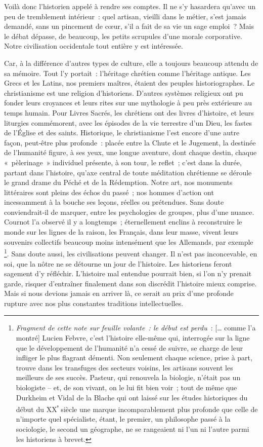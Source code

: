\documentclass[french,twoside]{book} %
\begin{document}
Voilà donc l’historien appelé à rendre ses comptes. Il ne s’y hasardera qu’avec un peu de tremblement intérieur : quel artisan, vieilli dans le métier, s’est jamais demandé, sans un pincement de cœur, s’il a fait de sa vie un sage emploi ? Mais le débat dépasse, de beaucoup, les petits scrupules d’une morale corporative. Notre civilisation occidentale tout entière y est intéressée.\par
Car, à la différence d’autres types de culture, elle a toujours beaucoup attendu de sa mémoire. Tout l’y portait : l’héritage chrétien comme l’héri­tage antique. Les Grecs et les Latins, nos premiers maîtres, étaient des peuples historiographes. Le christianisme est une religion d’historiens. D’autres systèmes religieux ont pu fonder leurs croyances et leurs rites sur une mythologie à peu près extérieure au temps humain. Pour Livres Sacrés, les chrétiens ont des livres d’histoire, et leurs liturgies commé­morent, avec les épisodes de la vie terrestre d’un Dieu, les fastes de l’Église et des saints. Historique, le christianisme l’est encore d’une autre façon, peut‑être plus profonde : placée entre la Chute et le Jugement, la destinée de l’humanité figure, à ses yeux, une longue aventure, dont chaque destin, chaque « pèlerinage » individuel présente, à son tour, le reflet ; c’est dans la durée, partant dans l’histoire, qu’axe central de toute méditation chré­tienne se déroule le grand drame du Péché et de la Rédemption. Notre  
\label{pX} art, nos monuments littéraires sont pleins des échos du passé ; nos hommes d’action ont incessamment à la bouche ses leçons, réelles ou prétendues. Sans doute conviendrait‑il de marquer, entre les psychologies de groupes, plus d’une nuance. Cournot l’a observé il y a longtemps ; éternellement enclins à reconstruire le monde sur les lignes de la raison, les Français, dans leur masse, vivent leurs souvenirs collectifs beaucoup moins intensé­ment que les Allemands, par exemple \footnote{\emph{Fragment de cette note sur feuille volante : le début est perdu} : [… comme l’a montré] Lucien Febvre, c’est l’histoire elle‑même qui, interrogée sur la ligne que le développement de l’humanité n’a cessé de suivre, se charge de leur infliger le plus flagrant démenti. Non seulement chaque science, prise à part, trouve dans les transfuges des secteurs voisins, les artisans souvent les meilleurs de ses succès. Pasteur, qui renouvela la biologie, n’était pas un biologiste – et, de son vivant, on le lui fit bien voir ; tout de même que Durkheim et Vidal de la Blache qui ont laissé sur les études historiques du début du XX\textsuperscript{ᵉ} siècle une marque incom­parablement plus profonde que celle de n’importe quel spécialiste, étant, le pre­mier, un philosophe passé à la sociologie, le second un géographe, ne se rangeaient ni l’un ni l’autre parmi les historiens à brevet.}. Sans doute aussi, les civilisations peuvent changer. Il n’est pas inconcevable, en soi, que la nôtre ne se détourne un jour de l’histoire. Les historiens feront sagement d’y réfléchir. L’histoire mal entendue pourrait bien, si l’on n’y prenait garde, risquer d’entraîner finalement dans son discrédit l’histoire mieux comprise. Mais si nous devions jamais en arriver là, ce serait au prix d’une profonde rupture avec nos plus constantes traditions intellectuelles.\par
\end{document}
